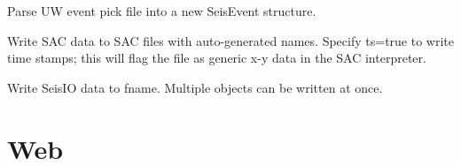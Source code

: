 \documentclass[letterpaper,11pt,english]{sphinxmanual}
\begin{document}
\begin{fulllineitems}
\label{\detokenize{src/Formats/fileformats:uwpf}}
\end{fulllineitems}


Parse UW event pick file  into a new SeisEvent structure.

\begin{fulllineitems}
\label{\detokenize{src/Formats/fileformats:writesac}}
\end{fulllineitems}


\begin{fulllineitems}
\label{\detokenize{src/Formats/fileformats:wsac}}
\end{fulllineitems}


Write SAC data to SAC files with auto-generated names. Specify ts=true to write time stamps; this will flag the file as generic x-y data in the SAC interpreter.

\begin{fulllineitems}
\label{\detokenize{src/Formats/fileformats:wseis}}
\end{fulllineitems}


\begin{fulllineitems}
\end{fulllineitems}


Write SeisIO data to fname. Multiple objects can be written at once.


\chapter{Web}
\label{\detokenize{index:web}}
\end{document}
